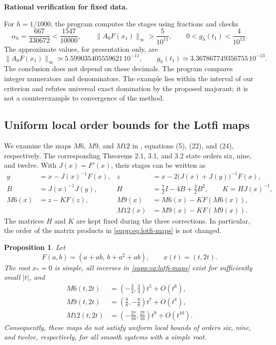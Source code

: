 \documentclass[11pt,a4paper]{article}
\numberwithin{equation}{section}
\numberwithin{table}{section}
\theoremstyle{plain}
\newtheorem{proposition}[theorem]{Proposition}
\theoremstyle{definition}\newtheorem{definition}[theorem]{Definition}
\theoremstyle{remark}\newtheorem{remark}[theorem]{Remark}
\begin{document}
\medskip\noindent\textbf{Rational verification for fixed data.}\par
For $h=1/1000$, the program
 computes the stages
using fractions and checks
\[
 \alpha_h=\frac{667}{330672}<\frac{1547}{10000},\qquad
 \|A_0F(x_1)\|_\infty>\frac5{10^{11}},\qquad
 0<g_h(t_1)<\frac4{10^{13}}.
\]
The approximate values, for presentation only, are
\[
 \|A_0F(x_1)\|_\infty\simeq5.599035405559621\,10^{-11},\qquad
 g_h(t_1)\simeq3.367867749356755\,10^{-13}.
\]
The conclusion does not depend on these decimals. The program compares
integer numerators and denominators. The example lies within the
interval of our criterion and refutes universal exact domination by
the proposed majorant; it is not a counterexample to convergence of
the method.



\subsection{Uniform local order bounds for the Lotfi maps}
\label{supp:lotfi}
We examine the maps $M6$, $M9$, and $M12$ in
\cite{LotfiEtAl2015}, equations (5), (22), and (24), respectively.
The corresponding Theorems 2.1, 3.1, and 3.2 state orders six, nine,
and twelve. With $J(x)=F'(x)$, their stages can be written as
\begin{equation}
\begin{aligned}
 y&=x-J(x)^{-1}F(x),&
 z&=x-2\bigl(J(x)+J(y)\bigr)^{-1}F(x),\\
 B&=J(x)^{-1}J(y),&
 H&=\tfrac72 I-4B+\tfrac32 B^2,\qquad K=HJ(x)^{-1},\\
 M6(x)&=z-KF(z),&
 M9(x)&=M6(x)-KF(M6(x)),\\
 &&M12(x)&=M9(x)-KF(M9(x)).
\end{aligned}
\label{supp:eq:lotfi-maps}
\end{equation}
The matrices $H$ and $K$ are kept fixed during the three corrections.
In particular, the order of the matrix products in
\eqref{supp:eq:lotfi-maps} is not changed.

\begin{proposition}\label{supp:prop:lotfi-orders}
Let
\[
 F(a,b)=(a+ab,\ b+a^2+ab),\qquad x(t)=(t,2t).
\]
The root $x_*=0$ is simple, all inverses in
\eqref{supp:eq:lotfi-maps} exist for sufficiently small $|t|$, and
\begin{equation}
\begin{aligned}
 M6(t,2t)&=(-\tfrac34,\tfrac34)t^5+O(t^6),\\
 M9(t,2t)&=(\tfrac98,-\tfrac98)t^7+O(t^8),\\
 M12(t,2t)&=(-\tfrac{27}{16},\tfrac{27}{16})t^9+O(t^{10}).
\end{aligned}
\label{supp:eq:lotfi-leading}
\end{equation}
Consequently, these maps do not satisfy uniform local bounds of
orders six, nine, and twelve, respectively, for all smooth systems
with a simple root.
\end{proposition}
\end{document}
